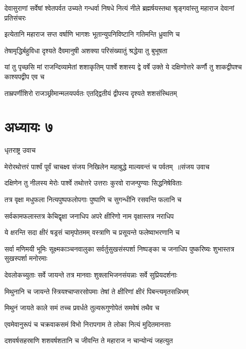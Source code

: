\threelineshloka
{देवासुराणां सर्वेषां श्वेतपर्वत उच्यते}
{गन्धर्वा निषधे नित्यं नीले ब्रह्मर्षयस्तथा}
{श्रृङ्गवांस्तु महाराज देवानां प्रतिसंचरः}


\twolineshloka
{इत्येतानि महाराज सप्त वर्षाणि भागशः}
{भूतान्युपनिविष्टानि गतिमन्ति ध्रुवाणि च}


\twolineshloka
{तेषामृद्धिर्बहुविधा दृश्यते दैवमानुषी}
{अशक्या परिसंख्यातुं श्रद्धेया तु बुभूषता}


\threelineshloka
{यां तु पृच्छसि मां राजन्दिव्यामेतां शशाकृतिम्}
{पार्श्वे शशस्य द्वे वर्षे उक्ते ये दक्षिणोत्तरे}
{कर्णौ तु शाकद्वीपश्च काश्यपद्वीप एव च}


\twolineshloka
{ताम्रपर्णीशिरो राजञ्छ्रीमान्मलयपर्वतः}
{एतद्द्वितीयं द्वीपस्य दृश्यते शशसंस्थितम्}


\chapter{अध्यायः ७}
\twolineshloka
{धृतराष्ट्र उवाच}
{}


\threelineshloka
{मेरोरथोत्तरं पार्श्वं पूर्वं चाचक्ष्व संजय}
{निखिलेन महाबुद्धे माल्यवन्तं च पर्वतम् ॥संजय उवाच}
{}


\twolineshloka
{दक्षिणेन तु नीलस्य मेरोः पार्श्वे तथोत्तरे}
{उत्तराः कुरवो राजन्पुण्याः सिद्धनिषेविताः}


\twolineshloka
{तत्र वृक्षा मधुफला नित्यपुष्पफलोपगाः}
{पुष्पाणि च सुगन्धीनि रसवन्ति फलानि च}


\twolineshloka
{सर्वकामफलास्तत्र केचिद्वृक्षा जनाधिप}
{अपरे क्षीरिणो नाम वृक्षास्तत्र नराधिप}


\twolineshloka
{ये क्षरन्ति सदा क्षीरं षड्रसं चामृपोतमम्}
{वस्त्राणि च प्रसूयन्ते फलेष्वाभरणानि च}


\threelineshloka
{सर्वा मणिमयी भूमिः सूक्ष्मकाञ्चनवालुका}
{सर्वर्तुसुखसंस्पर्शा निष्पङ्का च जनाधिप}
{पुष्करिष्यः शुभास्तत्र सुखस्पर्शा मनोरमाः}


\twolineshloka
{देवलोकच्युताः सर्वे जायन्ते तत्र मानवाः}
{शुक्लाभिजनसंयन्नाः सर्वे सुप्रियदर्शनाः}


\twolineshloka
{मिथुनानि च जायन्ते स्त्रियश्चाप्सरसोपमाः}
{तेषां ते क्षीरिणां क्षीरं पिबन्त्यमृतसन्निभम्}


\twolineshloka
{मिथुनं जायते काले समं तच्च प्रवर्धते}
{तुल्यरूगुणोपेतं समवेषं तथैव च}


\twolineshloka
{एवमेवानुरूपं च चक्रवाकसमं विभो}
{निरापगाम ते लोका नित्यं मुदितमानसाः}


\twolineshloka
{दशवर्षसहस्राणि शशवर्षशतानि च}
{जीवन्ति ते महाराज न चान्योन्यं जहत्युत}


